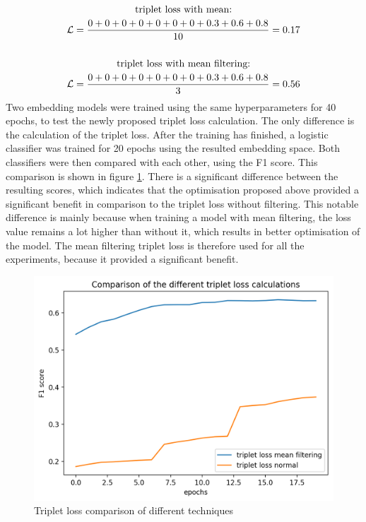 \begin{equation}
    \centering
    \begin{gathered}
        \text{triplet loss with mean:}\\
        \mathcal{L} = \frac{0 + 0+ 0+ 0+ 0+ 0+ 0+ 0.3+ 0.6+ 0.8}{10} = 0.17 \\
        \\
        \text{triplet loss with mean filtering:}\\
        \mathcal{L} = \frac{0+ 0+ 0+ 0+ 0+ 0+ 0+ 0.3+ 0.6+ 0.8}{3} = 0.56
    \end{gathered}
    \label{eq:Triplet-loss-justification}
\end{equation}
Two embedding models were trained using the same hyperparameters for 40 epochs, to test the newly proposed triplet loss calculation. The only difference is the calculation of the triplet loss. After the training has finished, a logistic classifier was trained for 20 epochs using the resulted embedding space. Both classifiers were then compared with each other, using the F1 score. This comparison is shown in figure \ref{fig:Triplet-Loss-Techniques}. There is a significant difference between the resulting scores, which indicates that the optimisation proposed above provided a significant benefit in comparison to the triplet loss without filtering. This notable difference is mainly because when training a model with mean filtering, the loss value remains a lot higher than without it, which results in better optimisation of the model. The mean filtering triplet loss is therefore used for all the experiments, because it provided a significant benefit.
\begin{figure}[ht]
\centering
    \includegraphics[width=0.6\linewidth]{img/Triplet-Loss-Comparison-Techniques.png}
    \caption{Triplet loss comparison of different techniques}
    \label{fig:Triplet-Loss-Techniques}
\end{figure}

